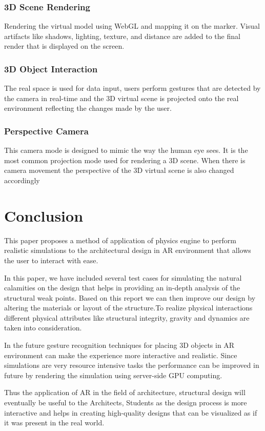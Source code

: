 \documentclass[conference]{IEEEtran}
\begin{document}
\subsubsection{3D Scene Rendering}
Rendering the virtual model using WebGL and mapping it on the marker. Visual artifacts like shadows, lighting, texture, and distance are added to the final render that is displayed on the screen.
\subsubsection{3D Object Interaction}
The real space is used for data input, users perform gestures that are detected by the camera in real-time and the 3D virtual scene is projected onto the real environment reflecting the changes made by the user.

\subsubsection{Perspective Camera}
This camera mode is designed to mimic the way the human eye sees. It is the most common projection mode used for rendering a 3D scene. When there is camera movement the perspective of the 3D virtual scene is also changed accordingly
\section{Conclusion}
This paper proposes a method of application of physics engine to perform realistic simulations to the architectural design in AR environment that allows the user to interact with ease.

In this paper, we have included several test cases for simulating the natural calamities on the design that helps in providing an in-depth analysis of the structural weak points. Based on this report we can then improve our design by altering the materials or layout of the structure.To realize physical interactions different physical attributes like structural integrity, gravity and dynamics are taken into consideration. 

In the future gesture recognition techniques for placing 3D objects in AR environment can make the experience more interactive and realistic.
Since simulations are very resource intensive tasks the performance can be improved in future by rendering the simulation using server-side GPU computing.

Thus the application of AR in the field of architecture, structural design will eventually be useful to the Architects, Students as the design process is more interactive and helps in creating high-quality designs that can be visualized as if it was present in the real world.



\end{document}
